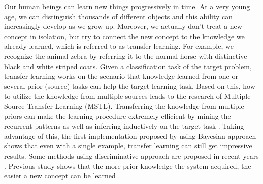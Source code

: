 Our human beings can learn new things progressively in time. At a very young age, we can distinguish thousands of different objects and this ability can increasingly develop as we grow up. Moreover, we actually don't treat a new concept in isolation, but try to connect the new concept to the knowledge we already learned, which is referred to as transfer learning. For example, we recognize the animal zebra by referring it to the normal horse with distinctive black and white striped coats. Given a classification task of the target problem, transfer learning works on the scenario that knowledge learned from one or several prior (source) tasks can help the target learning task. 
Based on this, how to utilize the knowledge from multiple sources leads to the research of Multiple Source Transfer
Learning (MSTL). Transferring the knowledge from multiple priors can make the learning procedure extremely efficient by mining the recurrent patterns as well as inferring inductively on the target task \cite{tommasi2014learning}. Taking advantage of this, the first implementation proposed by \cite{fei2006one} using Bayesian approach shows that even with a single example, transfer learning can still get impressive results. Some methods using discriminative approach are proposed in recent years \cite{tommasi2014learning} \cite{kuzborskij2013n} \cite{jie2011multiclass}. Previous study shows that the more prior knowledge the system acquired, the easier a new concept can be learned \cite{Thrun96islearning}.


